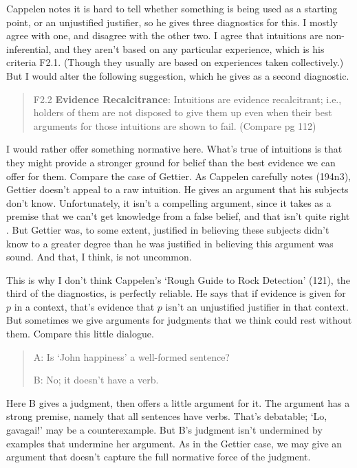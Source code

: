 Cappelen notes it is hard to tell whether something is being used as a starting point, or an unjustified justifier, so he gives three  diagnostics for this. I mostly agree with one, and disagree with the other two. I agree that intuitions are non-inferential, and they aren't based on any particular experience, which is his criteria F2.1. (Though they usually are based on experiences taken collectively.) But I would alter the following suggestion, which he gives as a second diagnostic.

\begin{quote}
F2.2 \textbf{Evidence Recalcitrance}:  Intuitions are evidence recalcitrant; i.e., holders of them are not disposed to give them up even when their best arguments for those intuitions are shown to fail. (Compare pg 112)
\end{quote}

\noindent I would rather offer something normative here. What's true of intuitions is that they might provide a  stronger ground for belief than the best evidence we can offer for them. Compare the case of Gettier. As Cappelen carefully notes (194n3), Gettier doesn't appeal to a raw intuition. He gives an argument that his subjects don't know. Unfortunately, it isn't a compelling argument, since it takes as a premise that we can't get knowledge from a false belief, and that isn't quite right \citep{Warfield2005}. But Gettier was, to some extent, justified in believing these subjects didn't know to a greater degree than he was justified in believing this argument was sound. And that, I think, is not uncommon.

This is why I don't think Cappelen's `Rough Guide to Rock Detection' (121), the third of the diagnostics, is perfectly reliable. He says that if evidence is given for $p$ in a context, that's evidence that $p$ isn't an unjustified justifier in that context. But sometimes we give arguments for judgments that we think could rest without them. Compare this little dialogue.

\begin{quote}
A: Is `John happiness' a well-formed sentence?

B: No; it doesn't have a verb.
\end{quote}

\noindent Here B gives a judgment, then offers a little argument for it. The argument has a strong premise, namely that all sentences have verbs. That's debatable; `Lo, gavagai!' may be a counterexample. But B's judgment isn't undermined by examples that undermine her argument. As in the Gettier case, we may give an argument that doesn't capture the full normative force of the judgment.

